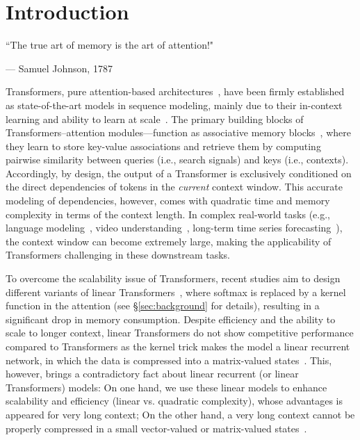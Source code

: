 \vspace{5ex}
\section{Introduction}\label{sec:intro}
\vspace{-8ex}
\epigraph{``The true art of memory is the art of attention!"}{--- \textup{Samuel Johnson}, 1787}
\vspace{1ex}

\lettrine[lines=3]{T}{}ransformers, pure attention-based architectures~\citep{transformers}, have been firmly established as state-of-the-art models in sequence modeling, mainly due to their in-context learning and ability to learn at scale~\citep{kaplan2020scaling}. The primary building blocks of Transformers–attention modules—function as associative memory blocks~\citep{bietti2024birth}, where they learn to store key-value associations and retrieve them by computing pairwise similarity between queries (i.e., search signals) and keys (i.e., contexts). Accordingly, by design, the output of a Transformer is exclusively conditioned on the direct dependencies of tokens in the \emph{current} context window. This accurate modeling of dependencies, however, comes with quadratic time and memory complexity in terms of the context length. In complex real-world tasks (e.g., language modeling~\citep{liu2024lost}, video understanding~\citep{wu2019long}, long-term time series forecasting~\citep{zhou2021informer}), the context window can become extremely large, making the applicability of Transformers challenging in these downstream tasks.  


To overcome the scalability issue of Transformers, recent studies aim to design different variants of linear Transformers~\citep{katharopoulos2020transformers, kacham2024polysketchformer, yang2024gatedattn}, where softmax is replaced by a kernel function in the attention (\textcolor{c1}{see \S}\ref{sec:background} \textcolor{c1}{for details}), resulting in a significant drop in memory consumption. Despite efficiency and the ability to scale to longer context, linear Transformers do not show competitive performance compared to Transformers as the kernel trick makes the model a linear recurrent network, in which the data is compressed into a matrix-valued states~\citep{katharopoulos2020transformers}. This, however, brings a contradictory fact about linear recurrent (or linear Transformers) models: On one hand, we use these linear models to enhance scalability and efficiency (linear vs. quadratic complexity), whose advantages is appeared for very long context; On the other hand, a very long context cannot be properly compressed in a small vector-valued or matrix-valued states~\citep{wang2024longssm}. 



